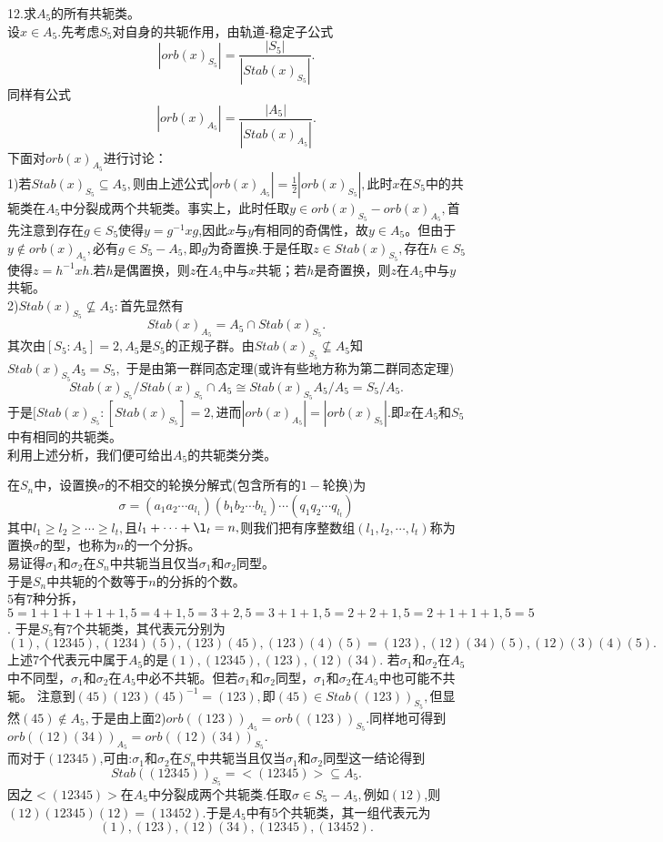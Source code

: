\documentclass[UTF8]{article}
\begin{document}
   12.求$A_{5}$的所有共轭类。\\
   设$x\in A_{5}$.先考虑$S_{5}$对自身的共轭作用，由轨道-稳定子公式
   $$
   |orb(x)_{S_{5}}|=\frac{|S_{5}|}{|Stab(x)_{S_{5}}|}.
   $$
   同样有公式
    $$
   |orb(x)_{A_{5}}|=\frac{|A_{5}|}{|Stab(x)_{A_{5}}|}.
   $$
   下面对$orb(x)_{A_{5}}$进行讨论：\\
   1)若$Stab(x)_{S_{5}}\subseteq A_{5},$则由上述公式$|orb(x)_{A_{5}}|=\frac{1}{2}|orb(x)_{S_{5}}|,$此时$x$在$S_{5}$中的共轭类在$A_{5}$中分裂成两个共轭类。事实上，此时任取$y\in orb(x)_{S_{5}}-orb(x)_{A_{5}},$首先注意到存在$g\in S_{5}$使得$y=g^{-1}xg$,因此$x$与$y$有相同的奇偶性，故$y\in A_{5}$。但由于$y\notin orb(x)_{A_{5}},$必有$g\in S_{5}-A_{5},$即$g$为奇置换.于是任取$z\in Stab(x)_{S_{5}},$存在$h\in S_{5}$使得$z=h^{-1}xh.$若$h$是偶置换，则$z$在$A_{5}$中与$x$共轭；若$h$是奇置换，则$z$在$A_{5}$中与$y$共轭。\\
   2)$Stab(x)_{S_{5}}\not\subseteq A_{5}:$首先显然有
       $$Stab(x)_{A_{5}}=A_{5}\cap Stab(x)_{S_{5}}.$$
   其次由$[S_{5}:A_{5}]=2,$$A_{5}$是$S_{5}$的正规子群。由$Stab(x)_{S_{5}}\not\subseteq A_{5}$知$Stab(x)_{S_{5}}A_{5}=S_{5},$
   于是由第一群同态定理(或许有些地方称为第二群同态定理)
   $$Stab(x)_{S_{5}}/Stab(x)_{S_{5}}\cap A_{5}\cong Stab(x)_{S_{5}}A_{5}/A_{5}=S_{5}/A_{5}.$$
   于是$[Stab(x)_{S_{5}}:[Stab(x)_{S_{5}}]=2,$进而$|orb(x)_{A_{5}}|=|orb(x)_{S_{5}}|.$即$x$在$A_{5}$和$S_{5}$中有相同的共轭类。\\
   利用上述分析，我们便可给出$A_{5}$的共轭类分类。
  
   在$S_{n}$中，设置换$\sigma$的不相交的轮换分解式(包含所有的$1-$轮换)为
   $$
   \sigma=(a_{1}a_{2}\cdots a_{l_{1}})(b_{1}b_{2}\cdots b_{l_{2}})\cdots (q_{1}q_{2}\cdots q_{l_{t}})
   $$
   其中$l_{1}\geq l_{2}\geq \cdots \geq l_{t},$且$l_{1}+\cdots+\l_{t}=n,$则我们把有序整数组$(l_{1},l_{2},\cdots,l_{t})$称为置换$\sigma$的型，也称为$n$的一个分拆。\\
   易证得$\sigma_{1}$和$\sigma_{2}$在$S_{n}$中共轭当且仅当$\sigma_{1}$和$\sigma_{2}$同型。\\
   于是$S_{n}$中共轭的个数等于$n$的分拆的个数。\\
   $5$有$7$种分拆，$5=1+1+1+1+1,5=4+1,5=3+2,5=3+1+1,5=2+2+1,5=2+1+1+1,5=5$.
   于是$S_{5}$有$7$个共轭类，其代表元分别为
   $$(1),(12345),(1234)(5),(123)(45),(123)(4)(5)=(123),(12)(34)(5),(12)(3)(4)(5).$$
   上述$7$个代表元中属于$A_{5}$的是$(1),(12345),(123),(12)(34).$
   若$\sigma_{1}$和$\sigma_{2}$在$A_{5}$中不同型，$\sigma_{1}$和$\sigma_{2}$在$A_{5}$中必不共轭。但若$\sigma_{1}$和$\sigma_{2}$同型，$\sigma_{1}$和$\sigma_{2}$在$A_{5}$中也可能不共轭。
  注意到$(45)(123)(45)^{-1}=(123),$即$(45)\in Stab((123))_{S_{5}},$但显然$(45)\notin A_{5},$于是由上面2)$orb((123))_{A_{5}}=orb((123))_{S_{5}}.$同样地可得到$orb((12)(34))_{A_{5}}=orb((12)(34))_{S_{5}}.$\\
  而对于$(12345)$,可由:$\sigma_{1}$和$\sigma_{2}$在$S_{n}$中共轭当且仅当$\sigma_{1}$和$\sigma_{2}$同型这一结论得到 $$Stab((12345))_{S_{5}}=<(12345)>\subseteq A_{5}.$$
  因之$<(12345)>$在$A_{5}$中分裂成两个共轭类.任取$\sigma\in S_{5}- A_{5},$例如$(12)$,则
  $(12)(12345)(12)=(13452).$于是$A_{5}$中有$5$个共轭类，其一组代表元为
  $$(1),(123),(12)(34),(12345),(13452).$$
   
   
   
   
   
\end{document}
